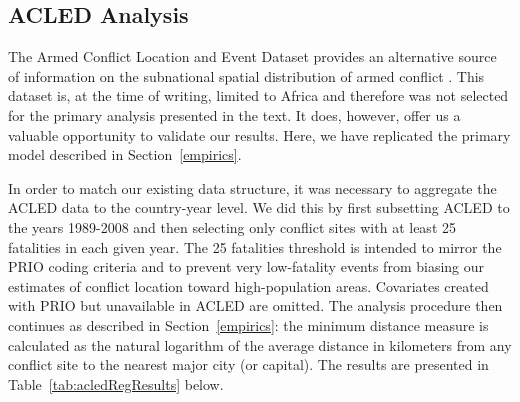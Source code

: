 
\FloatBarrier

\newpage
\subsection{ACLED Analysis}
\label{acled}

The Armed Conflict Location and Event Dataset provides an alternative source of information on the subnational spatial distribution of armed conflict \citep{raleigh:linke:etal:2010}. This dataset is, at the time of writing, limited to Africa and therefore was not selected for the primary analysis presented in the text. It does, however, offer us a valuable opportunity to validate our results. Here, we have replicated the primary model described in Section~\ref{empirics}.

In order to match our existing data structure, it was necessary to aggregate the ACLED data to the country-year level. We did this by first subsetting ACLED to the years 1989-2008 and then selecting only conflict sites with at least 25 fatalities in each given year. The 25 fatalities threshold is intended to mirror the PRIO coding criteria and to prevent very low-fatality events from biasing our estimates of conflict location toward high-population areas. Covariates created with PRIO but unavailable in ACLED are omitted. The analysis procedure then continues as described in Section~\ref{empirics}: the minimum distance measure is calculated as the natural logarithm of the average distance in kilometers from any conflict site to the nearest major city (or capital). The results are presented in Table~\ref{tab:acledRegResults} below. 


\FloatBarrier
